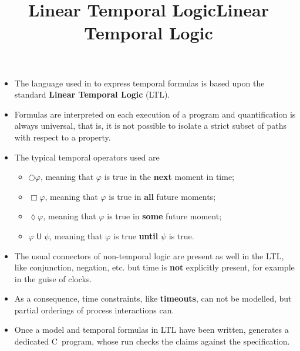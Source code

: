 \documentclass[wide]{slides}
\begin{document}
\begin{slide}
  \title{Linear Temporal Logic}

  \begin{itemize}

    \item The language used in \Promela to express temporal formulas
      is based upon the standard \textbf{Linear Temporal Logic} (LTL).

    \item Formulas are interpreted on each execution of a program and
      quantification is always universal, that is, it is not possible
      to isolate a strict subset of paths with respect to a property.

    \item The typical temporal operators used are
      \begin{itemize}

        \item $\bigcirc \varphi$, meaning that $\varphi$ is true in
          the \textbf{next} moment in time;

        \item $\Box \varphi$, meaning that $\varphi$ is true in
          \textbf{all} future moments;

        \item $\lozenge \varphi$, meaning that $\varphi$ is true in
          \textbf{some} future moment;

        \item $\varphi \mathrel{\textsf{U}} \psi$, meaning that
          $\varphi$ is true \textbf{until} $\psi$ is true.

      \end{itemize}
  \end{itemize}
\end{slide}

\begin{slide}
  \title{Linear Temporal Logic}

  \begin{itemize}

    \item The usual connectors of non\hyp{}temporal logic are present
      as well in the LTL, like conjunction, negation, etc. but time is
      \textbf{not} explicitly present, for example in the guise of
      clocks.

    \item As a consequence, time constraints, like \textbf{timeouts},
      can not be modelled, but partial orderings of process
      interactions can.

    \item Once a \Promela model and temporal formulas in LTL have been
      written, \SPIN generates a dedicated \textsf{C}~program, whose
      run checks the claims against the specification.

  \end{itemize}

\end{slide}
\end{document}
